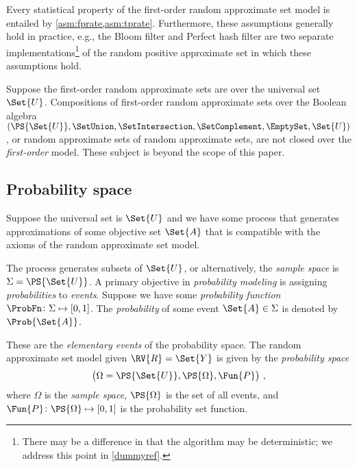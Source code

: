 \documentclass[ ../main.tex]{subfiles}
\begin{document}
Every statistical property of the first-order random approximate set model is entailed by \cref{asm:fprate,asm:tprate}.
Furthermore, these assumptions generally hold in practice, e.g., the Bloom filter\cite{bf} and Perfect hash filter\cite{phf} are two separate implementations\footnote{There may be a difference in that the algorithm may be deterministic; we address this point in \cref{dummyref}.} of the random positive approximate set in which these assumptions hold.

Suppose the first-order random approximate sets are over the universal set $\Set{U}$.
Compositions of first-order random approximate sets over the Boolean algebra $(\PS{\Set{U}},\SetUnion,\SetIntersection,\SetComplement,\EmptySet,\Set{U})$, or random approximate sets of random approximate sets, are not closed over the \emph{first-order} model.
These subject is beyond the scope of this paper.

\subsection{Probability space}
\label{sec:prob_model}
Suppose the universal set is $\Set{U}$ and we have some process that generates approximations of some objective set $\Set{A}$ that is compatible with the axioms of the random approximate set model.


The process generates subsets of $\Set{U}$, or alternatively, the \emph{sample space} is $\Sigma = \PS{\Set{U}}$.
A primary objective in \emph{probability modeling} is assigning \emph{probabilities} to \emph{events}.
Suppose we have some \emph{probability function} $\ProbFn \colon \Sigma \mapsto [0,1]$.
The \emph{probability} of some event $\Set{A} \in \Sigma$ is denoted by $\Prob{\Set{A}}$.


These are the \emph{elementary events} of the probability space.
The random approximate set model given $\RV{R} = \Set{Y}$ is given by the \emph{probability space}
\begin{equation}
\left(\Omega = \PS{\Set{U}}, \PS{\Omega}, \Fun{P}\right)\,,
\end{equation}
where $\Omega$ is the \emph{sample space}, $\PS{\Omega}$ is the set of all events, and $\Fun{P} \colon \PS{\Omega} \mapsto [0,1]$ is the probability set function.


\end{document}
